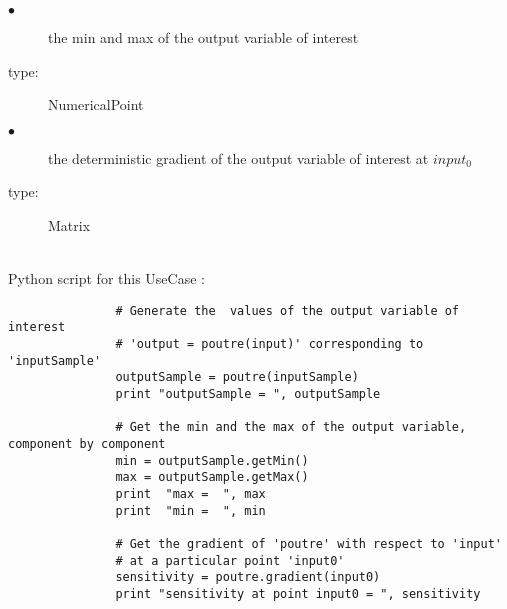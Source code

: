              {
               \begin{description}
               \item[$\bullet$] the min and max of the output variable of interest
               \item[type:] NumericalPoint
               \item[$\bullet$] the deterministic gradient of the output variable of interest at $input_0$
               \item[type:] Matrix
               \end{description}
             }

             \textspace\\
             Python script for this UseCase :

             \begin{lstlisting}
               # Generate the  values of the output variable of interest
               # 'output = poutre(input)' corresponding to 'inputSample'
               outputSample = poutre(inputSample)
               print "outputSample = ", outputSample

               # Get the min and the max of the output variable, component by component
               min = outputSample.getMin()
               max = outputSample.getMax()
               print  "max =  ", max
               print  "min =  ", min

               # Get the gradient of 'poutre' with respect to 'input'
               # at a particular point 'input0'
               sensitivity = poutre.gradient(input0)
               print "sensitivity at point input0 = ", sensitivity
             \end{lstlisting}
